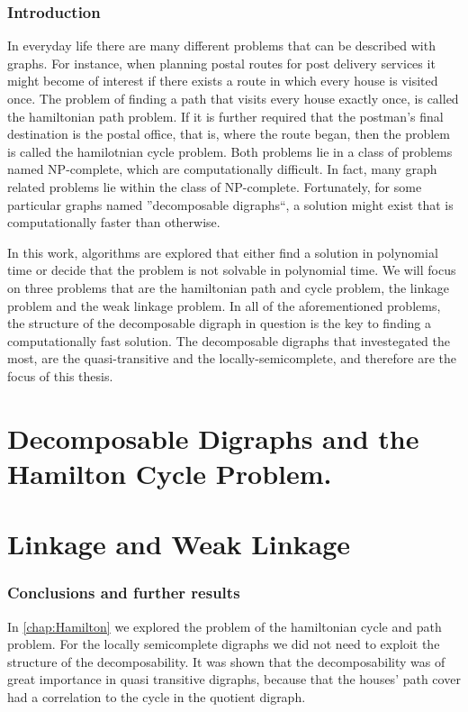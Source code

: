 \documentclass[11pt,oneside,a4paper]{report}
\begin{document}
	\section{Introduction}
	In everyday life there are many different problems that can be described with graphs.
	For instance, when planning postal routes for post delivery services it might become of interest if there exists a route in which every house is visited once.
	The problem of finding a path that visits every house exactly once, is called the hamiltonian path problem.
	If it is further required that the postman's final destination is the postal office, that is, where the route began, then the problem is called the hamilotnian cycle problem.
	Both problems lie in a class of problems named NP-complete, which are computationally difficult.
	In fact, many graph related problems lie within the class of NP-complete.
	Fortunately, for some particular graphs named ''decomposable digraphs``, a solution might exist that is computationally faster than otherwise.
	
	In this work, algorithms are explored that either find a solution in polynomial time or decide that the problem is not solvable in polynomial time.
	We will focus on three problems that are the hamiltonian path and cycle problem, the linkage problem and the weak linkage problem.
	In all of the aforementioned problems, the structure of the decomposable digraph in question is the key to finding a computationally fast solution.
	The decomposable digraphs that investegated the most, are the quasi-transitive and the locally-semicomplete, and therefore are the focus of this thesis.

	\part{Decomposable Digraphs and the Hamilton Cycle Problem.}
	
	\clearpage
	\part{Linkage and Weak Linkage}
	
	\clearpage
	\clearpage
	\section{Conclusions and further results}
	In \autoref{chap:Hamilton} we explored the problem of the hamiltonian cycle and path problem.
	For the locally semicomplete digraphs we did not need to exploit the structure of the decomposability.
	It was shown that the decomposability was of great importance in quasi transitive digraphs, because that the houses' path cover had a correlation to the cycle in the quotient digraph.
\end{document}
